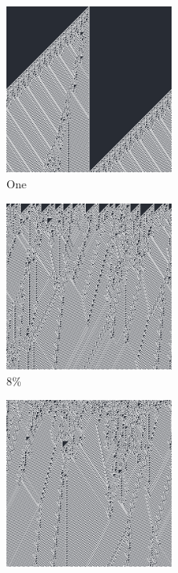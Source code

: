 \documentclass[12pt, fleqn]{report}                             %
\theoremstyle{break}                                            %
\begin{document}
      \begin{figure}[ht!]
        \centering
        \begin{subfigure}[b]{0.4\linewidth}
          \includegraphics[width=0.6\textwidth]{Images/110/a.png}
          \caption{One}
        \end{subfigure}
        \begin{subfigure}[b]{0.4\linewidth}
          \includegraphics[width=0.6\textwidth]{Images/110/b.png}
          \caption{8\%}
        \end{subfigure}
        \begin{subfigure}[b]{0.4\linewidth}
          \includegraphics[width=0.6\textwidth]{Images/110/c.png}

\end{subfigure}
\end{figure}
\end{document}
